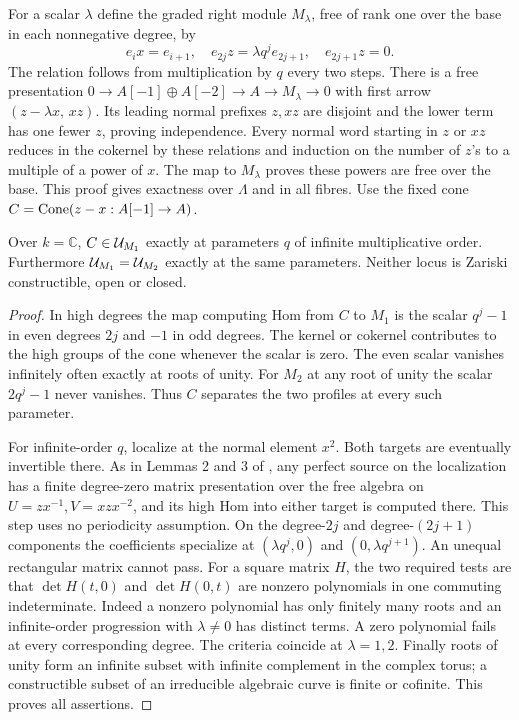\documentclass[11pt]{article}
\begin{document}
For a scalar $\lambda$ define the graded right module $M_\lambda$,
free of rank one over the base in each nonnegative degree, by
\[
 e_i x=e_{i+1},\quad e_{2j}z=\lambda q^j e_{2j+1},\quad
 e_{2j+1}z=0 .
\]
The relation follows from multiplication by $q$ every two steps. There
is a free presentation $0\to A[-1]\oplus A[-2]\to A\to M_\lambda\to0$
with first arrow $(z-\lambda x,\,xz)$. Its leading normal prefixes $z,xz$
are disjoint and the lower term has one fewer $z$, proving independence.
Every normal word starting in $z$ or $xz$ reduces in the cokernel by
these relations and induction on the number of $z$'s to a multiple of
a power of $x$. The map to $M_\lambda$ proves these powers are free
over the base. This proof gives exactness over $\Lambda$ and in all fibres.
Use the fixed cone $C=\operatorname{Cone}(z-x:A[-1]\to A)$.

\begin{thm}\label{jump}
Over $k=\mathbb C$, $C\in\mathcal U_{M_1}$ exactly at parameters $q$
of infinite multiplicative order. Furthermore
$\mathcal U_{M_1}=\mathcal U_{M_2}$ exactly at the same parameters. Neither locus
is Zariski constructible, open or closed.
\end{thm}
\begin{proof}
In high degrees the map computing Hom from $C$ to $M_1$ is the scalar
$q^j-1$ in even degrees $2j$ and $-1$ in odd degrees. The kernel or
cokernel contributes to the high groups of the cone whenever the scalar
is zero. The even scalar vanishes infinitely often exactly at roots of
unity. For $M_2$ at any root of unity the scalar $2q^j-1$ never vanishes.
Thus $C$ separates the two profiles at every such parameter.

For infinite-order $q$, localize at the normal element $x^2$. Both
targets are eventually invertible there. As in Lemmas 2 and 3 of
, any perfect source on the localization
has a finite degree-zero matrix presentation over the free algebra
on $U=zx^{-1}, V=xzx^{-2}$, and its high Hom into either target is
computed there. This step uses no periodicity assumption. On the
degree-$2j$ and degree-$(2j+1)$ components the coefficients specialize
at $(\lambda q^j,0)$ and $(0,\lambda q^{j+1})$. An unequal rectangular
matrix cannot pass. For a square matrix $H$, the two required tests
are that $\det H(t,0)$ and $\det H(0,t)$ are nonzero polynomials in
one commuting indeterminate. Indeed a nonzero polynomial has only finitely
many roots and an infinite-order progression with $\lambda\ne0$ has
distinct terms. A zero polynomial fails at every corresponding degree.
The criteria coincide at $\lambda=1,2$. Finally roots of unity form an
infinite subset with infinite complement in the complex torus; a
constructible subset of an irreducible algebraic curve is finite or
cofinite. This proves all assertions.
\end{proof}
\end{document}
